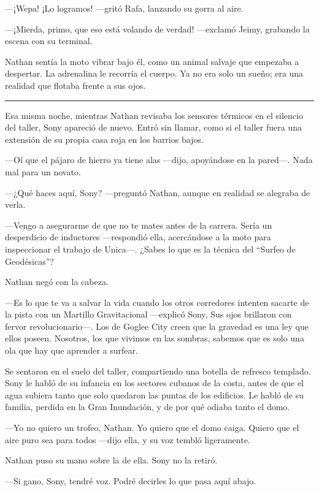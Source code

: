 \documentclass[12pt,a4paper]{book}
\begin{document}
---¡Wepa! ¡Lo logramos! ---gritó Rafa, lanzando su gorra al aire.

---¡Mierda, primo, que eso está volando de verdad! ---exclamó Jeimy, grabando la escena con su terminal.

Nathan sentía la moto vibrar bajo él, como un animal salvaje que empezaba a despertar. La adrenalina le recorría el cuerpo. Ya no era solo un sueño; era una realidad que flotaba frente a sus ojos.

\bigskip
\noindent\rule{\textwidth}{0.4pt}
\bigskip

Esa misma noche, mientras Nathan revisaba los sensores térmicos en el silencio del taller, Sony apareció de nuevo. Entró sin llamar, como si el taller fuera una extensión de su propia casa roja en los barrios bajos.

---Oí que el pájaro de hierro ya tiene alas ---dijo, apoyándose en la pared---. Nada mal para un novato.

---¿Qué haces aquí, Sony? ---preguntó Nathan, aunque en realidad se alegraba de verla.

---Vengo a asegurarme de que no te mates antes de la carrera. Sería un desperdicio de inductores ---respondió ella, acercándose a la moto para inspeccionar el trabajo de Unica---. ¿Sabes lo que es la técnica del ``Surfeo de Geodésicas''?

Nathan negó con la cabeza.

---Es lo que te va a salvar la vida cuando los otros corredores intenten sacarte de la pista con un Martillo Gravitacional ---explicó Sony. Sus ojos brillaron con fervor revolucionario---. Los de Goglee City creen que la gravedad es una ley que ellos poseen. Nosotros, los que vivimos en las sombras, sabemos que es solo una ola que hay que aprender a surfear.

Se sentaron en el suelo del taller, compartiendo una botella de refresco templado. Sony le habló de su infancia en los sectores cubanos de la costa, antes de que el agua subiera tanto que solo quedaron las puntas de los edificios. Le habló de su familia, perdida en la Gran Inundación, y de por qué odiaba tanto el domo.

---Yo no quiero un trofeo, Nathan. Yo quiero que el domo caiga. Quiero que el aire puro sea para todos ---dijo ella, y su voz tembló ligeramente.

Nathan puso su mano sobre la de ella. Sony no la retiró.

---Si gano, Sony, tendré voz. Podré decirles lo que pasa aquí abajo.
\end{document}
